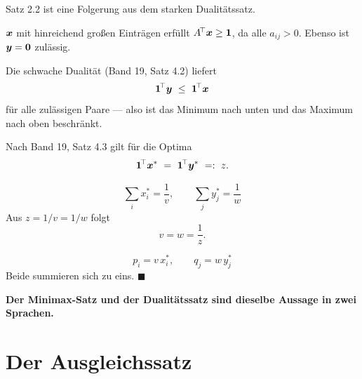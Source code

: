 \begin{merksatz}
Satz 2.2 ist eine Folgerung aus dem starken Dualitätssatz.

 $\boldsymbol{x}$ mit hinreichend großen Einträgen erfüllt $A^{\!\top}\boldsymbol{x} \ge \boldsymbol{1}$, da alle $a_{ij} > 0$. Ebenso ist $\boldsymbol{y} = \boldsymbol{0}$ zulässig.

 Die schwache Dualität (Band 19, Satz 4.2) liefert
\[ \boldsymbol{1}^{\!\top}\boldsymbol{y} \ \le\ \boldsymbol{1}^{\!\top}\boldsymbol{x} \]
für alle zulässigen Paare --- also ist das Minimum nach unten und das Maximum nach oben beschränkt.

Nach Band 19, Satz 4.3 gilt für die Optima
\[ \boldsymbol{1}^{\!\top}\boldsymbol{x}^{*} \ =\ \boldsymbol{1}^{\!\top}\boldsymbol{y}^{*} \ =:\ z . \]

\[ \sum_i x_i^{*} = \frac{1}{v}, \qquad \sum_j y_j^{*} = \frac{1}{w} \]
Aus $z = 1/v = 1/w$ folgt
\[ v = w = \frac1z . \]

\[ p_i = v\,x_i^{*}, \qquad q_j = w\,y_j^{*} \]
Beide summieren sich zu eins. $\blacksquare$

\begin{center}
\begin{minipage}{0.9\textwidth}
\textbf{Der Minimax-Satz und der Dualitätssatz sind dieselbe Aussage in zwei Sprachen.}
\end{minipage}
\end{center}

\begin{center}
\begin{minipage}{0.88\textwidth}
\end{minipage}
\end{center}
\end{merksatz}

\section{Der Ausgleichssatz}

